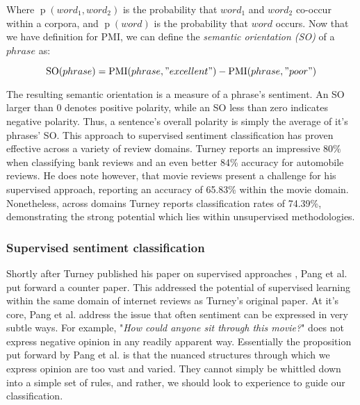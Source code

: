 Where $\operatorname{p}(word_1,word_2)$ is the probability that $word_1$ and $word_2$ co-occur within a corpora, and $\operatorname{p}(word)$ is the probability that $word$ occurs. Now that we have definition for PMI, we can define the \emph{semantic orientation (SO)} of a $phrase$ as:

\begin{equation}
	\operatorname{SO}(phrase) = \operatorname{PMI}(phrase, "excellent") - \operatorname{PMI}(phrase, "poor")
\end{equation}

The resulting semantic orientation is a measure of a phrase's sentiment. An SO larger than 0 denotes positive polarity, while an SO less than zero indicates negative polarity. Thus, a sentence's overall polarity is simply the average of it's phrases' SO. This approach to supervised sentiment classification has proven effective across a variety of review domains. Turney reports an impressive 80\% when classifying bank reviews and an even better 84\% accuracy for automobile reviews. He does note however, that movie reviews present a challenge for his supervised approach, reporting an accuracy of 65.83\% within the movie domain. Nonetheless, across domains Turney reports classification rates of 74.39\%, demonstrating the strong potential which lies within unsupervised methodologies.

\subsubsection{Supervised sentiment classification}

Shortly after Turney published his paper on supervised approaches \cite{Turney:2002vv}, Pang et al. put forward a counter paper. This addressed the potential of supervised learning within the same domain of internet reviews as Turney's original paper. At it's core, Pang et al. address the issue that often sentiment can be expressed in very subtle ways. For example, "\emph{How could anyone sit through this movie?}" does not express negative opinion in any readily apparent way. Essentially the proposition put forward by Pang et al. is that the nuanced structures through which we express opinion are too vast and varied. They cannot simply be whittled down into a simple set of rules, and rather, we should look to experience to guide our classification.

